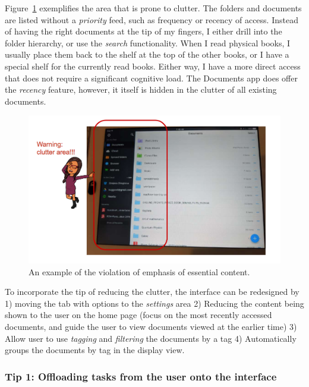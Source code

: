 \documentclass[12pt,letterpaper]{article}
\begin{document}
Figure~\ref{fig::4} exemplifies the area that is prone to clutter. The folders and documents are listed without a \textit{priority} feed, such as frequency or recency of access. Instead of having the right documents at the tip of my fingers, I either drill into the folder hierarchy, or use the \textit{search} functionality. When I read physical books, I usually place them back to the shelf at the top of the other books, or I have a special shelf for the currently read books. Either way, I have a more direct access that does not require a significant cognitive load. The Documents app does offer the \textit{recency} feature, however, it itself is hidden in the clutter of all existing documents.   

\begin{figure}[h]
\centering
\includegraphics[scale=.3]{figures/p2/clutter.png}
\caption{An example of the violation of emphasis of essential content.}
\label{fig::4}
\end{figure}

To incorporate the tip of reducing the clutter, the interface can be redesigned by 1) moving the tab with options to the \textit{settings} area 2) Reducing the content being shown to the user on the home page (focus on the most recently accessed documents, and guide the user to view documents viewed at the earlier time) 3) Allow user to use \textit{tagging} and \textit{filtering} the documents by a tag 4) Automatically groups the documents by tag in the display view.  

\subsubsection*{Tip 1: Offloading tasks from the user onto the interface}

 

\end{document}
